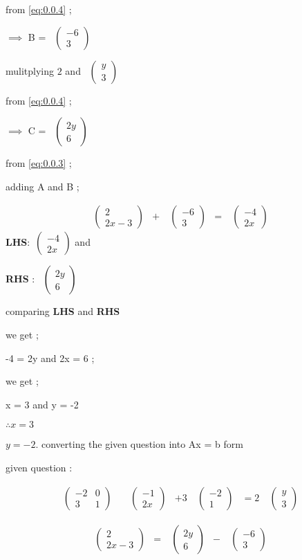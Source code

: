 \documentclass[journal,12pt,twocolumn]{IEEEtran}
\theoremstyle{remark}
\newcommand{\myvec}[1]{\ensuremath{\begin{pmatrix}#1\end{pmatrix}}}
\numberwithin{equation}{subsection}
\begin{document}
     from \eqref{eq:0.0.4} ;
      
       $\implies$  B = \ \myvec{-6 \\3 } 
       
       mulitplying 
    $2$ and  
\ \myvec{y \\ 3 } 

      
     from \eqref{eq:0.0.4} ;
      
       $\implies$  C = 
\ \myvec{2y \\6 } 
      
      from \eqref{eq:0.0.3} ; 
      
      adding A and B ;
       
     \begin{align}
&\ \myvec{2\\2x-3 }& +
&\ \myvec{-6\\3} & = 
&\ \myvec{-4\\2x} &
\end{align} 
      \newpage
\textbf{LHS}:\ \myvec{-4 \\2x } 
      and 
     
  \textbf {RHS} : 
\ \myvec{2y \\6 } 
      
      
      comparing \textbf{LHS} and \textbf{RHS}
      
      we get ;
      
      -4 = 2y and 2x = 6 ;
      
      we get ;
      
      x = 3 and y = -2 
      
  $ \therefore x = 3 $
     
                 $   y = -2 $.
     \newpage
   converting the given question into Ax = b form 
   
   given question :
   
     \begin{align}
&\ \myvec{-2 & 0\\3 & 1}&
&\ \myvec{-1\\2x}&
 + 3&\ \myvec{-2 \\1 }&
 = 2&\ \myvec{y \\3 }& 
      \end{align} 
      
     \begin{align}
&\ \myvec{2\\2x-3 }& =
&\ \myvec{2y\\6} &- 
&\ \myvec{-6\\3} &
\end{align} 
      
\end{document}
